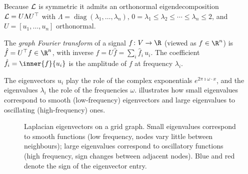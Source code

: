 Because $\mathcal{L}$ is symmetric it admits an orthonormal eigendecomposition
$\mathcal{L} = U \Lambda U^\top$ with $\Lambda = \operatorname{diag}(\lambda_1, \dots,
\lambda_n)$, $0 = \lambda_1 \le \lambda_2 \le \cdots \le \lambda_n \le 2$, and
$U = [u_1, \dots, u_n]$ orthonormal.

\begin{definition}
\label{def:graphs:gft}
The \emph{graph Fourier transform} of a signal $f \colon V \to \R$ (viewed as
$f \in \R^n$) is $\hat f = U^\top f \in \R^n$, with inverse
$f = U \hat f = \sum_i \hat f_i\, u_i$. The coefficient
$\hat f_i = \inner{f}{u_i}$ is the amplitude of $f$ at frequency $\lambda_i$.
\end{definition}

The eigenvectors $u_i$ play the role of the complex exponentials
$e^{2\pi \imath \omega \cdot x}$, and the eigenvalues $\lambda_i$ the role of the
frequencies $\omega$.  illustrates how small
eigenvalues correspond to smooth (low-frequency) eigenvectors and large
eigenvalues to oscillating (high-frequency) ones.

\begin{figure}[h]
\centering
{}
\caption[Laplacian eigenvectors]{Laplacian eigenvectors on a grid graph. Small
eigenvalues correspond to smooth functions (low frequency, nodes vary little
between neighbours); large eigenvalues correspond to oscillatory functions (high
frequency, sign changes between adjacent nodes). Blue and red denote the sign of
the eigenvector entry.}
\label{fig:graphs:eigenvectors}
\end{figure}

